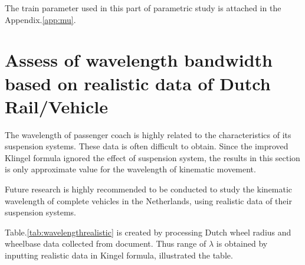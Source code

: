 The train parameter used in this part of parametric study is attached in the Appendix.\ref{app:mu}. 


\section{Assess of wavelength bandwidth based on realistic data of Dutch Rail/Vehicle}

The wavelength of passenger coach is highly related to the characteristics of its suspension systems. These data is often difficult to obtain. Since the improved Klingel formula ignored the effect of suspension system, the results in this section is only approximate value for the wavelength of kinematic movement.


Future research is highly recommended to be conducted to study the kinematic wavelength of complete vehicles in the Netherlands, using realistic data of their suspension systems.


Table.\ref{tab:wavelengthrealistic} is created by processing Dutch wheel radius and wheelbase data collected from document\cite{trainparameters}. 
Thus range of $\lambda$ is obtained by inputting realistic data in Kingel formula, illustrated the table.

